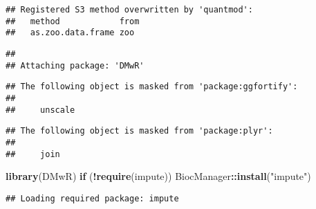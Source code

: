 \documentclass[]{article}
\newenvironment{Shaded}{\begin{snugshade}}{\end{snugshade}}
\newcommand{\ControlFlowTok}[1]{\textcolor[rgb]{0.13,0.29,0.53}{\textbf{#1}}}
\newcommand{\KeywordTok}[1]{\textcolor[rgb]{0.13,0.29,0.53}{\textbf{#1}}}
\newcommand{\NormalTok}[1]{#1}
\newcommand{\OperatorTok}[1]{\textcolor[rgb]{0.81,0.36,0.00}{\textbf{#1}}}
\newcommand{\StringTok}[1]{\textcolor[rgb]{0.31,0.60,0.02}{#1}}
\begin{document}
\begin{verbatim}
## Registered S3 method overwritten by 'quantmod':
##   method            from
##   as.zoo.data.frame zoo
\end{verbatim}

\begin{verbatim}
## 
## Attaching package: 'DMwR'
\end{verbatim}

\begin{verbatim}
## The following object is masked from 'package:ggfortify':
## 
##     unscale
\end{verbatim}

\begin{verbatim}
## The following object is masked from 'package:plyr':
## 
##     join
\end{verbatim}

\begin{Shaded}
\begin{Highlighting}[]
\KeywordTok{library}\NormalTok{(DMwR)}
\ControlFlowTok{if}\NormalTok{ (}\OperatorTok{!}\KeywordTok{require}\NormalTok{(impute)) BiocManager}\OperatorTok{::}\KeywordTok{install}\NormalTok{(}\StringTok{"impute"}\NormalTok{)}
\end{Highlighting}
\end{Shaded}

\begin{verbatim}
## Loading required package: impute
\end{verbatim}
\end{document}
